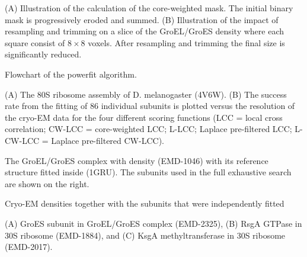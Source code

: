 \caption{}{(A) Illustration of the calculation of the core-weighted mask. The
initial binary mask is progressively eroded and summed. (B) Illustration of the
impact of resampling and trimming on a slice of the GroEL/GroES density where
each square consist of $8\times8$ voxels. After resampling and trimming the
final size is significantly reduced.}
\stopbuffer


\caption{Flowchart of the powerfit algorithm.}{}
\stopbuffer


\caption{}{(A) The 80S ribosome assembly of D. melanogaster (4V6W). (B) The
success rate from the fitting of 86 individual subunits is plotted versus the
resolution of the cryo-EM data for the four different scoring functions (LCC =
local cross correlation; CW-LCC = core-weighted LCC; L-LCC; Laplace
pre-filtered LCC; L-CW-LCC = Laplace pre-filtered CW-LCC).} 
\stopbuffer


\caption{}{The GroEL/GroES complex with density (EMD-1046) with its reference
structure fitted inside (1GRU). The subunits used in the full exhaustive search
are shown on the right.}
\stopbuffer


\caption{Cryo-EM densities together with the subunits that were independently
fitted}
{(A) GroES subunit in GroEL/GroES complex (EMD-2325), (B) RsgA GTPase in 30S
ribosome (EMD-1884), and (C) KsgA methyltransferase in 30S ribosome
(EMD-2017).}
\stopbuffer

